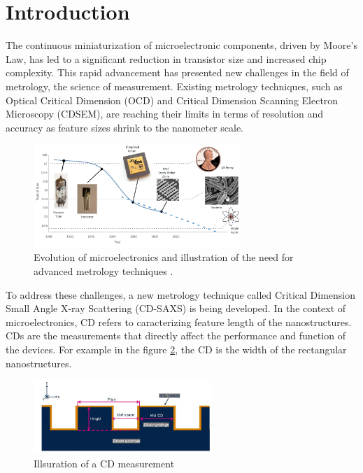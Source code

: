 \section{Introduction}

\medskip

The continuous miniaturization of microelectronic components, driven by Moore's Law, 
has led to a significant reduction in transistor size and increased chip complexity.
This rapid advancement has presented new challenges in the field of metrology, the science of measurement.
Existing metrology techniques, such as Optical Critical Dimension (OCD) and Critical Dimension Scanning 
Electron Microscopy (CDSEM), are reaching their limits in terms of resolution and accuracy as feature sizes
shrink to the nanometer scale.


\begin{figure}[h]
    \centering
    \includegraphics[width=0.7\textwidth]{images/moore's_law.png}
    \caption{Evolution of microelectronics and illustration of the need for advanced metrology techniques \cite{moore_law}.}
    \label{fig:evolution_microelectronics}
\end{figure}

\FloatBarrier

To address these challenges, a new metrology technique called Critical Dimension Small Angle X-ray Scattering
(CD-SAXS) is being developed. In the context of microelectronics, CD refers to caracterizing feature length
of the nanostructures. CDs are the measurements that directly affect the performance and function of the devices.
For example in the figure \ref{fig:cd_example}, the CD is the width of the rectangular nanostructures.

\begin{figure}[h]
    \centering
    \includegraphics[width=0.6\textwidth]{images/CD_example.png}
    \caption{Illsuration of a CD measurement}
    \label{fig:cd_example}
\end{figure}

